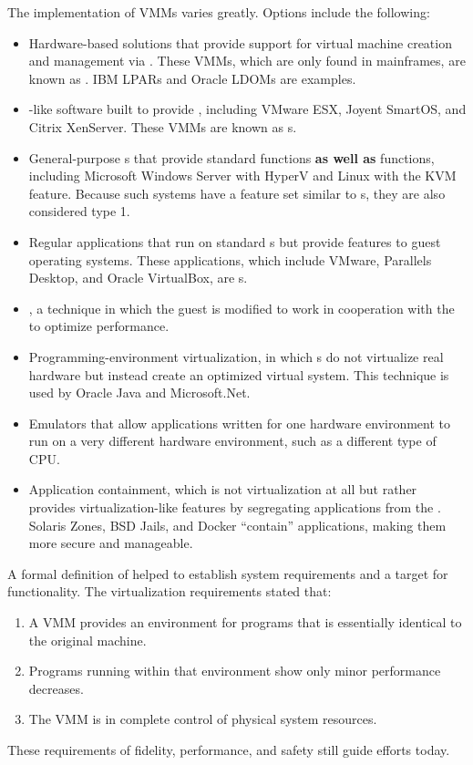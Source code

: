 The implementation of VMMs varies greatly. Options include the following:
\begin{itemize}[noitemsep]
\item Hardware-based solutions that provide support for virtual machine creation and management via .
  These VMMs, which are only found in mainframes, are known as .
  IBM LPARs and Oracle LDOMs are examples.
\item {}-like software built to provide , including VMware ESX, Joyent SmartOS, and Citrix XenServer.
  These VMMs are known as s.
\item General-purpose s that provide standard functions \textbf{as well as}  functions, including Microsoft Windows Server with HyperV and Linux with the KVM feature.
  Because such systems have a feature set similar to s, they are also considered type 1.
\item Regular applications that run on standard s but provide  features to guest operating systems.
  These applications, which include VMware, Parallels Desktop, and Oracle VirtualBox, are s.
\item {}, a technique in which the guest  is modified to work in cooperation with the  to optimize performance.
\item Programming-environment virtualization, in which s do not virtualize real hardware but instead create an optimized virtual system.
  This technique is used by Oracle Java and Microsoft.Net.
\item Emulators that allow applications written for one hardware environment to run on a very different hardware environment, such as a different type of CPU.\@
\item Application containment, which is not virtualization at all but rather provides virtualization-like features by segregating applications from the .
  Solaris Zones, BSD Jails, and Docker ``contain'' applications, making them more secure and manageable.
\end{itemize}

A formal definition of  helped to establish system requirements and a target for functionality.
The virtualization requirements stated that:
\begin{enumerate}[noitemsep]
\item A VMM provides an environment for programs that is essentially identical to the original machine.
\item Programs running within that environment show only minor performance decreases.
\item The VMM is in complete control of physical system resources.
\end{enumerate}

These requirements of fidelity, performance, and safety still guide  efforts today.


